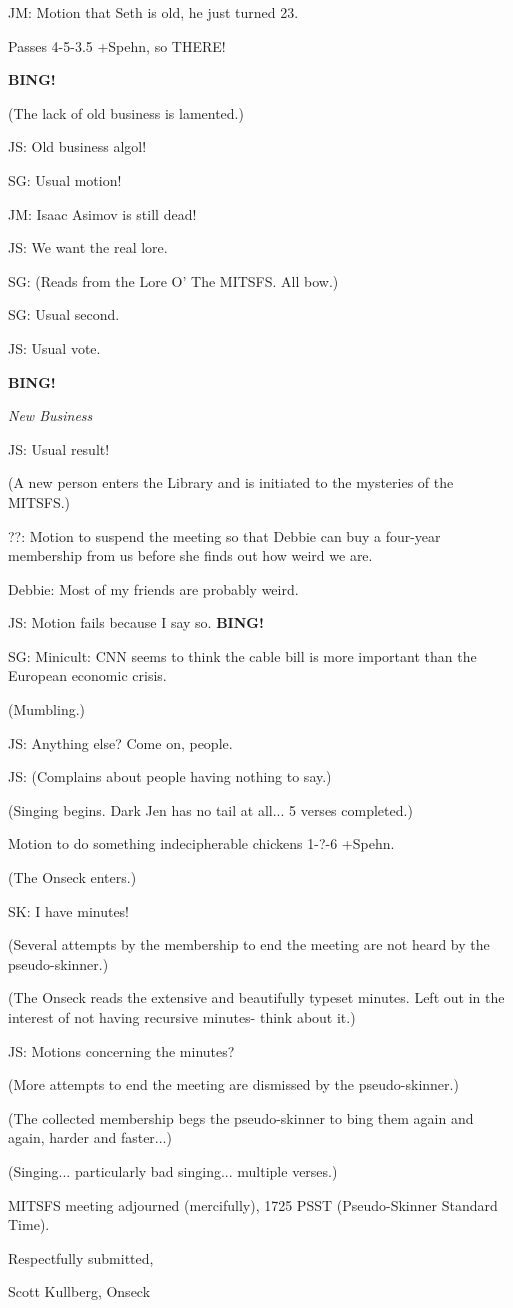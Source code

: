 \documentclass[12pt]{article}
\newcommand{\bing}{{\bf BING!} }
\newcommand{\goto}[1]{\bing \vskip 12pt \centerline{{\em{#1}}}}
\begin{document}
JM: Motion that Seth is old, he just turned 23.

Passes 4-5-3.5 +Spehn, so THERE!

\bing

(The lack of old business is lamented.)

JS: Old business algol!

SG: Usual motion!

JM: Isaac Asimov is still dead!

JS: We want the real lore.

SG: (Reads from the Lore O' The MITSFS. All bow.)

SG: Usual second.

JS: Usual vote.

\goto{New Business}

JS: Usual result!

(A new person enters the Library and is initiated to the mysteries of the MITSFS.)

??: Motion to suspend the meeting so that Debbie can buy a four-year membership from us before she finds out how weird we are.

Debbie: Most of my friends are probably weird.

JS: Motion fails because I say so. \bing

SG: Minicult: CNN seems to think the cable bill is more important than the European economic crisis.

(Mumbling.)

JS: Anything else? Come on, people.

JS: (Complains about people having nothing to say.)

(Singing begins. Dark Jen has no tail at all... 5 verses completed.)

Motion to do something indecipherable chickens 1-?-6 +Spehn.

(The Onseck enters.)

SK: I have minutes!

(Several attempts by the membership to end the meeting are not heard by the pseudo-skinner.)

(The Onseck reads the extensive and beautifully typeset minutes. Left out in the interest of not having recursive minutes- think about it.)

JS: Motions concerning the minutes?

(More attempts to end the meeting are dismissed by the pseudo-skinner.)

(The collected membership begs the pseudo-skinner to bing them again and again, harder and faster...)

(Singing... particularly bad singing... multiple verses.)

\vspace{12pt}

\noindent
MITSFS meeting adjourned (mercifully), 1725 PSST (Pseudo-Skinner Standard Time).

\vspace{18pt}

\centerline{Respectfully submitted,}
\centerline{Scott Kullberg, Onseck}
\end{document}
